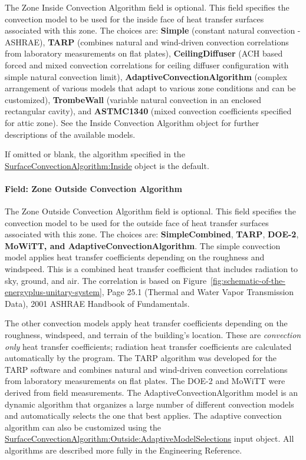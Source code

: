 The Zone Inside Convection Algorithm field is optional. This field specifies the convection model to be used for the inside face of heat transfer surfaces associated with this zone. The choices are: \textbf{Simple} (constant natural convection - ASHRAE), \textbf{TARP} (combines natural and wind-driven convection correlations from laboratory measurements on flat plates), \textbf{CeilingDiffuser} (ACH based forced and mixed convection correlations for ceiling diffuser configuration with simple natural convection limit), \textbf{AdaptiveConvectionAlgorithm} (complex arrangement of various models that adapt to various zone conditions and can be customized), \textbf{TrombeWall} (variable natural convection in an enclosed rectangular cavity), and \textbf{ASTMC1340} (mixed convection coefficients specified for attic zone). See the Inside Convection Algorithm object for further descriptions of the available models.

If omitted or blank, the algorithm specified in the \hyperref[surfaceconvectionalgorithminside]{SurfaceConvectionAlgorithm:Inside} object is the default.

\paragraph{Field: Zone Outside Convection Algorithm}\label{field-zone-outside-convection-algorithm}

The Zone Outside Convection Algorithm field is optional. This field specifies the convection model to be used for the outside face of heat transfer surfaces associated with this zone. The choices are: \textbf{SimpleCombined}, \textbf{TARP}, \textbf{DOE-2}, \textbf{MoWiTT, and AdaptiveConvectionAlgorithm}. The simple convection model applies heat transfer coefficients depending on the roughness and windspeed. This is a combined heat transfer coefficient that includes radiation to sky, ground, and air. The correlation is based on Figure~\ref{fig:schematic-of-the-energyplus-unitary-system}, Page 25.1 (Thermal and Water Vapor Transmission Data), 2001 ASHRAE Handbook of Fundamentals.

The other convection models apply heat transfer coefficients depending on the roughness, windspeed, and terrain of the building's location. These are \emph{convection only} heat transfer coefficients; radiation heat transfer coefficients are calculated automatically by the program. The TARP algorithm was developed for the TARP software and combines natural and wind-driven convection correlations from laboratory measurements on flat plates. The DOE-2 and MoWiTT were derived from field measurements. The AdaptiveConvectionAlgorithm model is an dynamic algorithm that organizes a large number of different convection models and automatically selects the one that best applies. The adaptive convection algorithm can also be customized using the \hyperref[surfaceconvectionalgorithmoutsideadaptivemodelselections]{SurfaceConvectionAlgorithm:Outside:AdaptiveModelSelections} input object. All algorithms are described more fully in the Engineering Reference.

